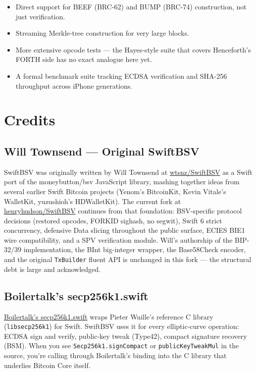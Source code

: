 \documentclass[a4paper, 11pt, openany]{book}
\begin{document}
\begin{itemize}
\item Direct support for BEEF (BRC-62) and BUMP (BRC-74) construction, not just verification.
\item Streaming Merkle-tree construction for very large blocks.
\item More extensive opcode tests --- the Hayes-style suite that covers Henceforth's FORTH side has no exact analogue here yet.
\item A formal benchmark suite tracking ECDSA verification and SHA-256 throughput across iPhone generations.
\end{itemize}

\chapter{Credits}

\section{Will Townsend --- Original SwiftBSV}

SwiftBSV was originally written by Will Townsend at \href{https://github.com/wtsnz/SwiftBSV}{wtsnz/SwiftBSV} as a Swift port of the moneybutton/bsv JavaScript library, mashing together ideas from several earlier Swift Bitcoin projects (Yenom's BitcoinKit, Kevin Vitale's WalletKit, yuzushioh's HDWalletKit). The current fork at \href{https://github.com/henryhudson/SwiftBSV}{henryhudson/SwiftBSV} continues from that foundation: BSV-specific protocol decisions (restored opcodes, FORKID sighash, no segwit), Swift 6 strict concurrency, defensive Data slicing throughout the public surface, ECIES BIE1 wire compatibility, and a SPV verification module. Will's authorship of the BIP-32/39 implementation, the BInt big-integer wrapper, the Base58Check encoder, and the original \texttt{TxBuilder} fluent API is unchanged in this fork --- the structural debt is large and acknowledged.

\section{Boilertalk's secp256k1.swift}

\href{https://github.com/Boilertalk/secp256k1.swift}{Boilertalk's secp256k1.swift} wraps Pieter Wuille's reference C library (\texttt{libsecp256k1}) for Swift. SwiftBSV uses it for every elliptic-curve operation: ECDSA sign and verify, public-key tweak (Type42), compact signature recovery (BSM). When you see \texttt{Secp256k1.signCompact} or \texttt{publicKeyTweakMul} in the source, you're calling through Boilertalk's binding into the C library that underlies Bitcoin Core itself.
\end{document}
